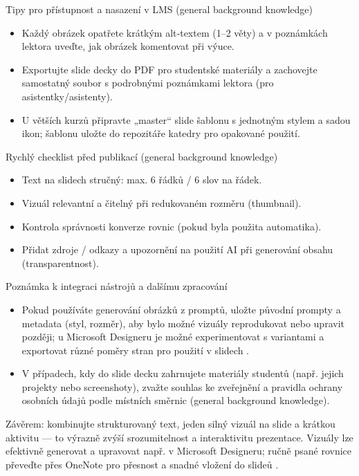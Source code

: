Tipy pro přístupnost a nasazení v LMS (general background knowledge)
\begin{itemize}
  \item Každý obrázek opatřete krátkým alt‑textem (1–2 věty) a v poznámkách lektora uveďte, jak obrázek komentovat při výuce.
  \item Exportujte slide decky do PDF pro studentské materiály a zachovejte samostatný soubor s podrobnými poznámkami lektora (pro asistentky/asistenty).
  \item U větších kurzů připravte „master“ slide šablonu s jednotným stylem a sadou ikon; šablonu uložte do repozitáře katedry pro opakované použití.
\end{itemize}

Rychlý checklist před publikací (general background knowledge)
\begin{itemize}
  \item Text na slidech stručný: max. 6 řádků / 6 slov na řádek.
  \item Vizuál relevantní a čitelný při redukovaném rozměru (thumbnail).
  \item Kontrola správnosti konverze rovnic (pokud byla použita automatika).
  \item Přidat zdroje / odkazy a upozornění na použití AI při generování obsahu (transparentnost).
\end{itemize}

Poznámka k integraci nástrojů a dalšímu zpracování
\begin{itemize}
  \item Pokud používáte generování obrázků z promptů, uložte původní prompty a metadata (styl, rozměr), aby bylo možné vizuály reprodukovat nebo upravit později; u Microsoft Designeru je možné experimentovat s variantami a exportovat různé poměry stran pro použití v slidech \cite{kb_ai_101_tipu_pdf_04e4a115_page_51_1}.
  \item V případech, kdy do slide decku zahrnujete materiály studentů (např. jejich projekty nebo screenshoty), zvažte souhlas ke zveřejnění a pravidla ochrany osobních údajů podle místních směrnic (general background knowledge).
\end{itemize}

Závěrem: kombinujte strukturovaný text, jeden silný vizuál na slide a krátkou aktivitu — to výrazně zvýší srozumitelnost a interaktivitu prezentace. Vizuály lze efektivně generovat a upravovat např. v Microsoft Designeru; ručně psané rovnice převeďte přes OneNote pro přesnost a snadné vložení do slideů \cite{kb_ai_101_tipu_pdf_04e4a115_page_51_1,kb_ai_101_tipu_pdf_04e4a115_page_8_1}.